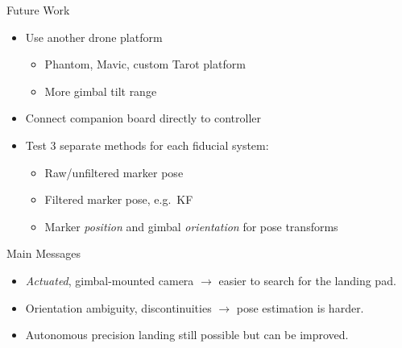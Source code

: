 \documentclass[aspectratio=169]{beamer}
\newif\ifpause
\newcommand{\mypause}{\ifpause \pause \fi}
\begin{document}
\begin{frame}{Future Work}
	\begin{itemize}
		\item Use another drone platform\mypause
		\begin{itemize}
			\item Phantom, Mavic, custom Tarot platform\mypause
			\item More gimbal tilt range
		\end{itemize}
			\mypause
		\item Connect companion board directly to controller
			\mypause
		\item Test 3 separate methods for each fiducial system:
			\mypause
		\begin{itemize}
			\item Raw/unfiltered marker pose
				\mypause
			\item Filtered marker pose, e.g.~KF
				\mypause
			\item Marker \emph{position} and gimbal \emph{orientation} for pose transforms
		\end{itemize}
	\end{itemize}
\end{frame}

\begin{frame}{Main Messages}
	\begin{itemize}
		\item \emph{Actuated}, gimbal-mounted camera
			\mypause $\rightarrow$ easier to search for the landing pad.
		\mypause\item Orientation ambiguity, discontinuities
			\mypause $\rightarrow$ pose estimation is harder.
		\mypause\item Autonomous precision landing still possible
			\mypause but can be improved.
	\end{itemize}
\end{frame}


\begin{frame}{}
\end{frame}
\end{document}
